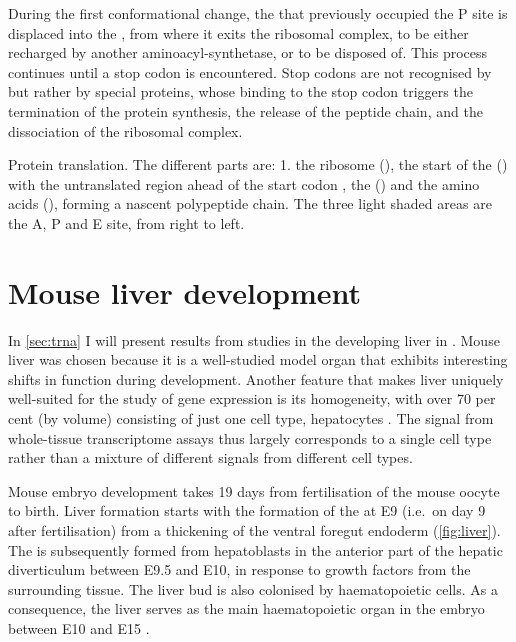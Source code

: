 During the first conformational change, the \trna that previously occupied the P
site is displaced into the , from where it exits the ribosomal
complex, to be either recharged by another aminoacyl-\trna synthetase, or to be
disposed of. This process continues until a stop codon is encountered. Stop
codons are not recognised by \trna[s] but rather by special proteins, whose
binding to the stop codon triggers the termination of the protein synthesis, the
release of the peptide chain, and the dissociation of the ribosomal complex.

    {Protein translation.}
    {The different parts are: 1. the ribosome (\tertiaryname{}), the start of
    the  (\primaryname{}) with the \fivep untranslated region ahead
    of the start codon , the \trna[s] (\secondaryname{}) and the
    amino acids (\quinaryname{}), forming a nascent polypeptide chain. The three
    light shaded areas are the A, P and E site, from right to left.}



\section{Mouse liver development}

In \cref{sec:trna} I will present results from studies in the developing liver
in \mmu. Mouse liver was chosen because it is a well-studied model organ that
exhibits interesting shifts in function during development. Another feature that
makes liver uniquely well-suited for the study of gene expression is its
homogeneity, with over \num{70} per cent (by volume) consisting of just one
cell type, hepatocytes \citep{Si-Tayeb:2010}. The signal from whole-tissue
transcriptome assays thus largely corresponds to a single cell type rather
than a mixture of different signals from different cell types.

Mouse embryo development takes \num{19} days from fertilisation of the mouse
oocyte to birth. Liver formation starts with the formation of the
 at E9 (i.e.\ on day \num{9} after fertilisation)
from a thickening of the ventral foregut endoderm (\cref{fig:liver}). The
 is subsequently formed from hepatoblasts in the anterior part
of the hepatic diverticulum between E9.5 and E10, in response to growth factors
from the surrounding tissue. The liver bud is also colonised by haematopoietic
cells. As a consequence, the liver serves as the main haematopoietic organ in
the embryo between E10 and E15 \citep{Zorn:2008}.

